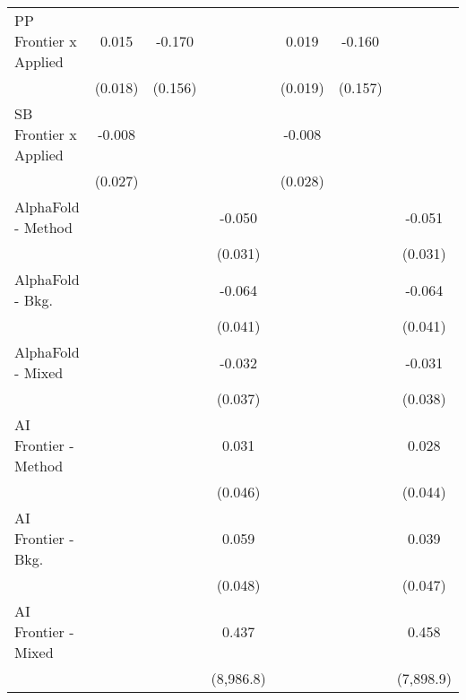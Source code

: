 \begin{tabular}{lcccccc}
   PP Frontier x Applied          & 0.015          & -0.170       &                & 0.019          & -0.160       &   \\   
                                  & (0.018)        & (0.156)      &                & (0.019)        & (0.157)      &   \\   
   SB Frontier x Applied          & -0.008         &              &                & -0.008         &              &   \\   
                                  & (0.027)        &              &                & (0.028)        &              &   \\   
   AlphaFold - Method             &                &              & -0.050         &                &              & -0.051\\   
                                  &                &              & (0.031)        &                &              & (0.031)\\   
   AlphaFold - Bkg.               &                &              & -0.064         &                &              & -0.064\\   
                                  &                &              & (0.041)        &                &              & (0.041)\\   
   AlphaFold - Mixed              &                &              & -0.032         &                &              & -0.031\\   
                                  &                &              & (0.037)        &                &              & (0.038)\\   
   AI Frontier - Method           &                &              & 0.031          &                &              & 0.028\\   
                                  &                &              & (0.046)        &                &              & (0.044)\\   
   AI Frontier - Bkg.             &                &              & 0.059          &                &              & 0.039\\   
                                  &                &              & (0.048)        &                &              & (0.047)\\   
   AI Frontier - Mixed            &                &              & 0.437          &                &              & 0.458\\   
                                  &                &              & (8,986.8)      &                &              & (7,898.9)\\   

\end{tabular}
